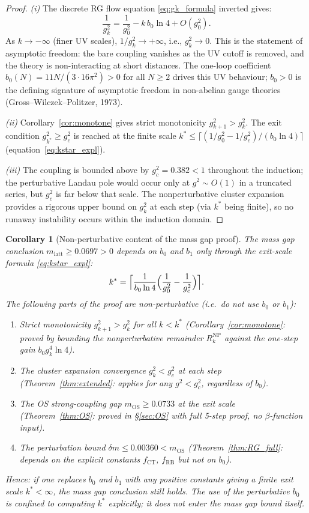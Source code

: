 \documentclass[11pt,a4paper]{amsart}
\newtheorem{corollary}[theorem]{Corollary}
\theoremstyle{definition}
\newcommand{\gB}{g^2_c}
\newcommand{\CT}{\mathrm{CT}}
\begin{document}
\begin{proof}
\emph{(i)} The discrete RG flow equation \eqref{eq:gk_formula} inverted gives:
\[
  \frac{1}{g^2_k} = \frac{1}{g^2_0} - k\,b_0\ln 4 + O(g^2_0).
\]
As $k \to -\infty$ (finer UV scales), $1/g^2_k \to +\infty$, i.e., $g^2_k \to 0$.
This is the statement of asymptotic freedom: the bare coupling vanishes as the
UV cutoff is removed, and the theory is non-interacting at short distances.
The one-loop coefficient $b_0(N) = 11N/(3\cdot16\pi^2) > 0$ for all $N\ge 2$
drives this UV behaviour; $b_0 > 0$ is the defining signature of asymptotic
freedom in non-abelian gauge theories (Gross--Wilczek--Politzer, 1973).

\emph{(ii)} Corollary~\ref{cor:monotone} gives strict monotonicity $g^2_{k+1} > g^2_k$.
The exit condition $g^2_{k^*} \ge g^2_c$ is reached at the finite scale
$k^* \le \lceil (1/g^2_0 - 1/g^2_c)/(b_0 \ln 4)\rceil$ (equation~\eqref{eq:kstar_expl}).

\emph{(iii)} The coupling is bounded above by $g^2_c = 0.382 < 1$ throughout the
induction; the perturbative Landau pole would occur only at $g^2 \sim O(1)$ in
a truncated series, but $g^2_c$ is far below that scale.  The nonperturbative
cluster expansion provides a rigorous upper bound on $g^2_k$ at each step (via
$k^*$ being finite), so no runaway instability occurs within the induction domain.
\end{proof}

\begin{corollary}[Non-perturbative content of the mass gap proof]
\label{cor:AF_nonpert}
The mass gap conclusion $m_{\mathrm{latt}} \ge 0.0697 > 0$ depends on
$b_0$ and $b_1$ \emph{only} through the exit-scale formula \eqref{eq:kstar_expl}:
\[
  k^* = \Bigl\lceil \frac{1}{b_0\ln 4}\Bigl(\frac{1}{g^2_0}-\frac{1}{\gB}\Bigr)\Bigr\rceil.
\]
The following parts of the proof are \emph{non-perturbative}
(i.e.\ do not use $b_0$ or $b_1$):
\begin{enumerate}[label=(\roman*)]
\item Strict monotonicity $g^2_{k+1} > g^2_k$ for all $k < k^*$
      (Corollary~\ref{cor:monotone}: proved by bounding the nonperturbative
      remainder $R_k^{\mathrm{NP}}$ against the one-step gain $b_0 g^4_k\ln 4$).
\item The cluster expansion convergence $g^2_k < \gB$ at each step
      (Theorem~\ref{thm:extended}: applies for any $g^2 < g^2_c$, regardless of $b_0$).
\item The OS strong-coupling gap $m_{\mathrm{OS}} \ge 0.0733$ at the exit scale
      (Theorem~\ref{thm:OS}: proved in §\ref{sec:OS} with full 5-step proof, no $\beta$-function input).
\item The perturbation bound $\delta m \le 0.00360 < m_{\mathrm{OS}}$
      (Theorem~\ref{thm:RG_full}: depends on the explicit constants $f_{\CT}$, $f_{\mathrm{RB}}$
      but not on $b_0$).
\end{enumerate}
Hence: \emph{if one replaces $b_0$ and $b_1$ with any positive constants} giving
a finite exit scale $k^* < \infty$, the mass gap conclusion still holds.
The use of the perturbative $b_0$ is confined to computing $k^*$ explicitly;
it does not enter the mass gap bound itself.
\end{corollary}
\end{document}
